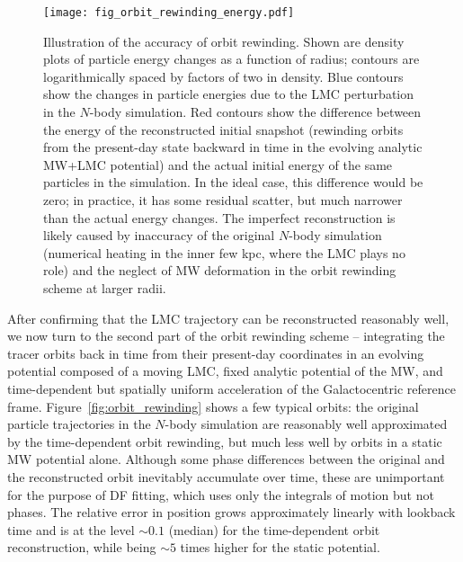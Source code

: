 \documentclass[usenatbib,fleqn]{mnras}
\begin{document}
\begin{figure}
\texttt{[image: fig\_orbit\_rewinding\_energy.pdf]}
\caption{Illustration of the accuracy of orbit rewinding. Shown are density plots of particle energy changes as a function of radius; contours are logarithmically spaced by factors of two in density. Blue contours show the changes in particle energies due to the LMC perturbation in the $N$-body simulation. Red contours show the difference between the energy of the reconstructed initial snapshot (rewinding orbits from the present-day state backward in time in the evolving analytic MW+LMC potential) and the actual initial energy of the same particles in the simulation. In the ideal case, this difference would be zero; in practice, it has some residual scatter, but much narrower than the actual energy changes. The imperfect reconstruction is likely caused by inaccuracy of the original $N$-body simulation (numerical heating in the inner few kpc, where the LMC plays no role) and the neglect of MW deformation in the orbit rewinding scheme at larger radii. 
}  \label{fig:orbit_rewinding_energy}
\end{figure}

After confirming that the LMC trajectory can be reconstructed reasonably well, we now turn to the second part of the orbit rewinding scheme -- integrating the tracer orbits back in time from their present-day coordinates in an evolving potential composed of a moving LMC, fixed analytic potential of the MW, and time-dependent but spatially uniform acceleration of the Galactocentric reference frame. Figure~\ref{fig:orbit_rewinding} shows a few typical orbits: the original particle trajectories in the $N$-body simulation are reasonably well approximated by the time-dependent orbit rewinding, but much less well by orbits in a static MW potential alone. Although some phase differences between the original and the reconstructed orbit inevitably accumulate over time, these are unimportant for the purpose of DF fitting, which uses only the integrals of motion but not phases. The relative error in position grows approximately linearly with lookback time and is at the level $\sim 0.1$ (median) for the time-dependent orbit reconstruction, while being $\sim 5$ times higher for the static potential.
\end{document}
